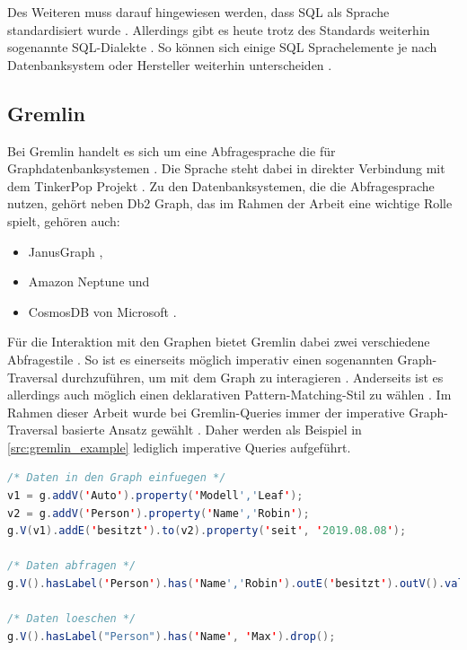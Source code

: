 Des Weiteren muss darauf hingewiesen werden, dass SQL als Sprache standardisiert wurde \cite{sql_history}. Allerdings gibt es heute trotz des Standards weiterhin sogenannte SQL-Dialekte \cite{sql_2017}. So können sich einige SQL Sprachelemente je nach Datenbanksystem oder Hersteller weiterhin unterscheiden \cite{sql_2017}. 

\subsection{Gremlin}

Bei Gremlin handelt es sich um eine Abfragesprache die für  Graphdatenbanksystemen \cite{tinkerpop_2020}. Die Sprache steht dabei in direkter Verbindung mit dem TinkerPop Projekt  \cite{tinkerpop_2020}. Zu den Datenbanksystemen, die die Abfragesprache nutzen, gehört neben Db2 Graph, das im Rahmen der Arbeit eine wichtige Rolle spielt, gehören auch:
\begin{itemize}
    \item JanusGraph \cite{janusgraph_2020},
    \item Amazon Neptune \cite{neptune_2021} und 
    \item CosmosDB von Microsoft \cite{cosmosdb_2021}.
\end{itemize}

Für die Interaktion mit den Graphen bietet Gremlin dabei zwei verschiedene Abfragestile \cite{gremlin_paper}. So ist es einerseits möglich imperativ einen sogenannten Graph-Traversal durchzuführen, um mit dem Graph zu interagieren \cite{gremlin_paper}. Anderseits ist es allerdings auch möglich einen deklarativen Pattern-Matching-Stil zu wählen \cite{gremlin_paper}. Im Rahmen dieser Arbeit wurde bei Gremlin-Queries immer der imperative Graph-Traversal basierte Ansatz gewählt \cite{gremlin_paper}. Daher werden als Beispiel in \autoref{src:gremlin_example} lediglich imperative Queries aufgeführt. 

\begin{lstlisting}[caption={Beispiel Gremlin-Queries},language=JAVA,label=src:gremlin_example]
/* Daten in den Graph einfuegen */
v1 = g.addV('Auto').property('Modell','Leaf');
v2 = g.addV('Person').property('Name','Robin');
g.V(v1).addE('besitzt').to(v2).property('seit', '2019.08.08');

/* Daten abfragen */
g.V().hasLabel('Person').has('Name','Robin').outE('besitzt').outV().values('Modell')

/* Daten loeschen */
g.V().hasLabel("Person").has('Name', 'Max').drop();
\end{lstlisting}

